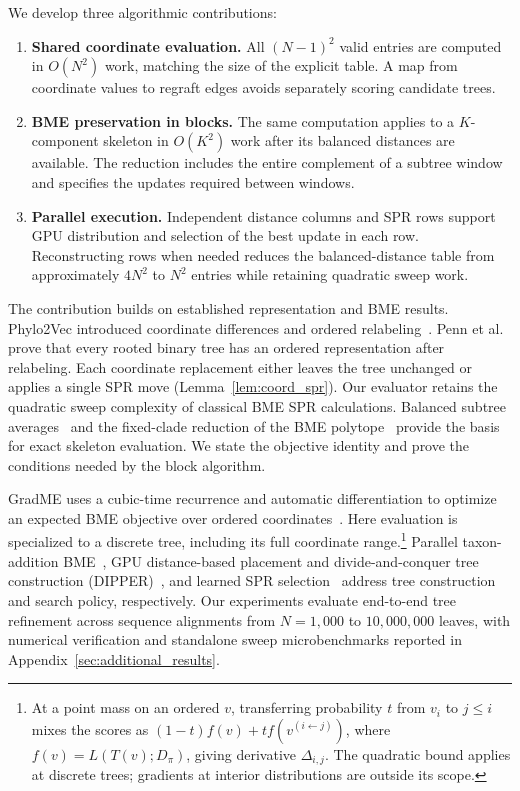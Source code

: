 \documentclass[11pt,a4paper]{article}
\makeatletter
\DeclareRobustCommand{\_}{\ifmmode\nfss@text{\textunderscore}\else\textunderscore\allowbreak\fi}
\theoremstyle{definition}
\makeatother
\begin{document}
\begin{samepage}
We develop three algorithmic contributions:
\begin{enumerate}
 \item \textbf{Shared coordinate evaluation.} All $(N-1)^2$ valid entries are computed in $O(N^2)$ work, matching the size of the explicit table. A map from coordinate values to regraft edges avoids separately scoring candidate trees.
 \item \textbf{BME preservation in blocks.} The same computation applies to a $K$-component skeleton in $O(K^2)$ work after its balanced distances are available. The reduction includes the entire complement of a subtree window and specifies the updates required between windows.
 \item \textbf{Parallel execution.} Independent distance columns and SPR rows support GPU distribution and selection of the best update in each row. Reconstructing rows when needed reduces the balanced-distance table from approximately $4N^2$ to $N^2$ entries while retaining quadratic sweep work.
\end{enumerate}
\end{samepage}

The contribution builds on established representation and BME results.
Phylo2Vec introduced coordinate differences and ordered relabeling~\cite[Section~1.3.2]{penn2024phylo2vec}.
Penn et al.~\cite[Lemmas~0.9--0.11]{penn2023gradme} prove that every rooted binary tree has an ordered representation after relabeling.
Each coordinate replacement either leaves the tree unchanged or applies a single SPR move (Lemma~\ref{lem:coord_spr}).
Our evaluator retains the quadratic sweep complexity of classical BME SPR calculations.
Balanced subtree averages~\cite{desper2002fast,desper2004theory} and the fixed-clade reduction of the BME polytope~\cite[Section~2.4]{haws2011optimality} provide the basis for exact skeleton evaluation.
We state the objective identity and prove the conditions needed by the block algorithm.

GradME uses a cubic-time recurrence and automatic differentiation to optimize an expected BME objective over ordered coordinates~\cite{penn2023gradme}.
Here evaluation is specialized to a discrete tree, including its full coordinate range.\footnote{At a point mass on an ordered $v$, transferring probability $t$ from $v_i$ to $j\leq i$ mixes the scores as $(1-t)f(v)+tf(v^{(i\leftarrow j)})$, where $f(v)=L(T(v);D_\pi)$, giving derivative $\Delta_{i,j}$. The quadratic bound applies at discrete trees; gradients at interior distributions are outside its scope.}
Parallel taxon-addition BME~\cite{tapo2026parallel}, GPU distance-based placement and divide-and-conquer tree construction (DIPPER)~\cite{walia2026dipper}, and learned SPR selection~\cite{camerota2026learning} address tree construction and search policy, respectively.
Our experiments evaluate end-to-end tree refinement across sequence alignments from $N=1{,}000$ to $10{,}000{,}000$ leaves, with numerical verification and standalone sweep microbenchmarks reported in Appendix~\ref{sec:additional_results}.
\end{document}
